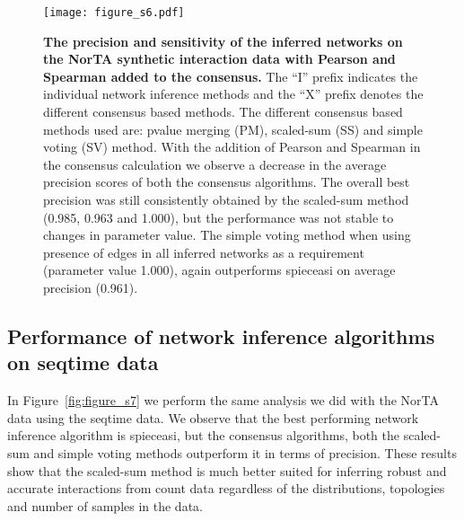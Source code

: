     \begin{figure}[H]
      \centering
      \texttt{[image: figure\_s6.pdf]}
    \end{figure}
    \begin{figure}[H]
      \centering
        \caption{
          \textbf{The precision and sensitivity of the inferred networks on the NorTA synthetic interaction data with Pearson and Spearman added to the consensus.}
            The ``I'' prefix indicates the individual network inference methods and the ``X'' prefix denotes the different consensus based methods.
            The different consensus based methods used are: pvalue merging (PM), scaled-sum (SS) and simple voting (SV) method.
            With the addition of Pearson and Spearman in the consensus calculation we observe a decrease in the average precision scores of both the consensus algorithms.
            The overall best precision was still consistently obtained by the scaled-sum method (0.985, 0.963 and 1.000), but the performance was not stable to changes in parameter value.
            The simple voting method when using presence of edges in all inferred networks as a requirement (parameter value 1.000), again outperforms \ac{spieceasi} on average precision (0.961).
        }
      \label{fig:figure_s6}
    \end{figure}
    \FloatBarrier
    \newpage


  \subsection*{Performance of network inference algorithms on seqtime data}

    In Figure~\ref{fig:figure_s7} we perform the same analysis we did with the NorTA data using the seqtime data.
    We observe that the best performing network inference algorithm is \ac{spieceasi}, but the consensus algorithms, both the scaled-sum and simple voting methods outperform it in terms of precision.
    These results show that the scaled-sum method is much better suited for inferring robust and accurate interactions from count data regardless of the distributions, topologies and number of samples in the data.

